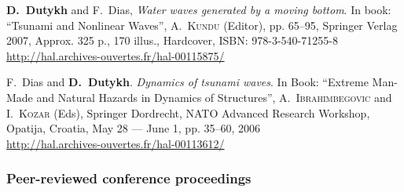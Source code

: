 \documentclass[final, a4paper, oneside, 12pt]{article}
\numberwithin{equation}{section}
\begin{document}
\begin{etaremune}

  
  \item \textbf{D.~Dutykh} and F.~Dias, \textit{Water waves generated by a moving bottom}. In book: ``Tsunami and Nonlinear Waves'', A.~\textsc{Kundu} (Editor), pp. 65--95, Springer Verlag 2007, Approx. 325 p., 170 illus., Hardcover, ISBN: 978-3-540-71255-8 \\ %
  \url{http://hal.archives-ouvertes.fr/hal-00115875/}
  

  
  \item F.~Dias and \textbf{D.~Dutykh}. \textit{Dynamics of tsunami waves}. In Book: ``Extreme Man-Made and Natural Hazards in Dynamics of Structures'', A.~\textsc{Ibrahimbegovic} and I.~\textsc{Kozar} (Eds), Springer Dordrecht, NATO Advanced Research Workshop, Opatija, Croatia, May 28 --- June 1, pp. 35--60, 2006 \\ %
  \url{http://hal.archives-ouvertes.fr/hal-00113612/}
  
\end{etaremune}

\subsubsection{Peer-reviewed conference proceedings}
\end{document}

